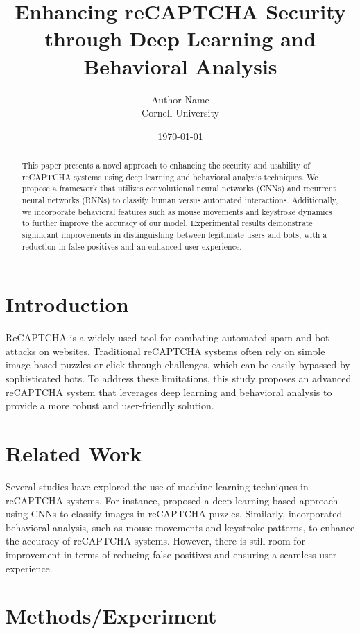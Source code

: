 \documentclass{article}
\title{Enhancing reCAPTCHA Security through Deep Learning and Behavioral Analysis}
\author{Author Name \\ Cornell University}
\date{\today}
\begin{document}
\maketitle

\begin{abstract}
This paper presents a novel approach to enhancing the security and usability of reCAPTCHA systems using deep learning and behavioral analysis techniques. We propose a framework that utilizes convolutional neural networks (CNNs) and recurrent neural networks (RNNs) to classify human versus automated interactions. Additionally, we incorporate behavioral features such as mouse movements and keystroke dynamics to further improve the accuracy of our model. Experimental results demonstrate significant improvements in distinguishing between legitimate users and bots, with a reduction in false positives and an enhanced user experience.
\end{abstract}

\section{Introduction}
\label{sec:introduction}

ReCAPTCHA is a widely used tool for combating automated spam and bot attacks on websites. Traditional reCAPTCHA systems often rely on simple image-based puzzles or click-through challenges, which can be easily bypassed by sophisticated bots. To address these limitations, this study proposes an advanced reCAPTCHA system that leverages deep learning and behavioral analysis to provide a more robust and user-friendly solution.

\section{Related Work}
\label{sec:related-work}

Several studies have explored the use of machine learning techniques in reCAPTCHA systems. For instance, \citet{chowdhury2019deep} proposed a deep learning-based approach using CNNs to classify images in reCAPTCHA puzzles. Similarly, \citet{chen2020behavioral} incorporated behavioral analysis, such as mouse movements and keystroke patterns, to enhance the accuracy of reCAPTCHA systems. However, there is still room for improvement in terms of reducing false positives and ensuring a seamless user experience.

\section{Methods/Experiment}
\label{sec:methods}
\end{document}
